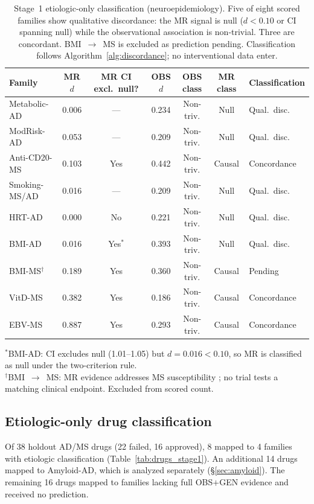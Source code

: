 \documentclass[11pt]{article}
\begin{document}
\begin{table}[t]
\centering
\caption{Stage~1 etiologic-only classification (neuroepidemiology). Five of eight scored families show qualitative discordance: the MR signal is null ($d < 0.10$ or CI spanning null) while the observational association is non-trivial. Three are concordant. BMI~$\to$~MS is excluded as prediction pending. Classification follows Algorithm~\ref{alg:discordance}; no interventional data enter.}
\label{tab:stage1}
\begin{tabular}{lcccccl}
\toprule
Family & MR $d$ & MR CI excl.\ null? & OBS $d$ & OBS class & MR class & Classification \\
\midrule
Metabolic-AD & 0.006 & --- & 0.234 & Non-triv. & Null & Qual.\ disc. \\
ModRisk-AD & 0.053 & --- & 0.209 & Non-triv. & Null & Qual.\ disc. \\
Anti-CD20-MS & 0.103 & Yes & 0.442 & Non-triv. & Causal & Concordance \\
Smoking-MS/AD & 0.016 & --- & 0.209 & Non-triv. & Null & Qual.\ disc. \\
HRT-AD & 0.000 & No & 0.221 & Non-triv. & Null & Qual.\ disc. \\
BMI-AD & 0.016 & Yes$^*$ & 0.393 & Non-triv. & Null & Qual.\ disc. \\
BMI-MS$^\dagger$ & 0.189 & Yes & 0.360 & Non-triv. & Causal & Pending \\
VitD-MS & 0.382 & Yes & 0.186 & Non-triv. & Causal & Concordance \\
EBV-MS & 0.887 & Yes & 0.293 & Non-triv. & Causal & Concordance \\
\bottomrule
\end{tabular}

\vspace{1mm}
{\footnotesize $^*$BMI-AD: CI excludes null (1.01--1.05) but $d = 0.016 < 0.10$, so MR is classified as null under the two-criterion rule.\\
$^\dagger$BMI~$\to$~MS: MR evidence addresses MS susceptibility \citep{mokry2016obesity}; no trial tests a matching clinical endpoint. Excluded from scored count.}
\end{table}

\subsection{Etiologic-only drug classification}

Of 38 holdout AD/MS drugs (22 failed, 16 approved), 8 mapped to 4 families with etiologic classification (Table~\ref{tab:drugs_stage1}). An additional 14 drugs mapped to Amyloid-AD, which is analyzed separately (\S\ref{sec:amyloid}). The remaining 16 drugs mapped to families lacking full OBS$+$GEN evidence and received no prediction.
\end{document}
